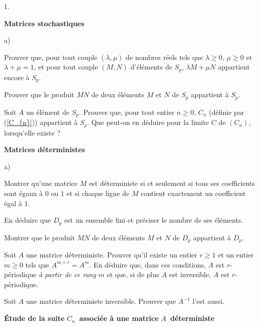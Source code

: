 \documentclass[11pt]{article}%
\begin{document}
\begin{noliste}{1.}
 \setlength{\itemsep}{4mm}
\item \textbf{Matrices stochastiques} 

\begin{noliste}{a)}
 \setlength{\itemsep}{2mm}
\item Prouver que, pour tout couple $(\lambda,\mu )$ de nombres réels
tels
que $\lambda \geq 0$, $\mu \geq 0$ et $\lambda + \mu = 1$, et pour
tout couple $(M,N)$ d'éléments de $S_{p}$, $\lambda M + \mu N$
appartient
encore à $S_{p}$. 

\item Prouver que le produit $MN$ de deux éléments $M$ et $N$ de
$S_{p}$
appartient à $S_{p}$. 

\item Soit $A$ un élément de $S_{p}$. Prouver que, pour tout entier
$n\geq 0$, $C_{n}$ (définie par (\ref{C_{n}})) appartient à $S_{p}$.
Que
peut-on en déduire pour la limite $C$ de $(C_{n})$, lorsqu'elle existe
? 
\end{noliste}

\item \textbf{Matrices déterministes} 

\begin{noliste}{a)}
 \setlength{\itemsep}{2mm}
\item Montrer qu'une matrice $M$ est déterministe si et seulement si
tous
ses coefficients sont égaux à $0$ ou $1$ et si chaque ligne de $M$
contient
exactement un coefficient égal à $1$. 

\item En déduire que $D_{p}$ est un ensemble fini et préciser le nombre
de
ses éléments. 

\item Montrer que le produit $MN$ de deux éléments $M$ et $N$ de
$D_{p}$
appartient à $D_{p}$. 

\item Soit $A$ une matrice déterministe. Prouver qu'il existe un entier
$r\geq 1$ et un entier $m\geq 0$ tels que $A^{m + r} = A^{m}$. En
déduire que, dans ces conditions, $A$ est $r$- périodique \emph{à
partir de ce
rang} $m$ et que, si de plus $A$ est inversible, $A$ est
$r$-périodique. 

\item Soit $A$ une matrice déterministe inversible. Prouver que
$A^{-1}$
l'est aussi. \label{determinisme_{i}nverse} 
\end{noliste}

\item \textbf{Étude de la suite }$C_{n}$\textbf{\ associée à une
matrice }$A$\textbf{\ déterministe} 


\end{noliste}
\end{document}
